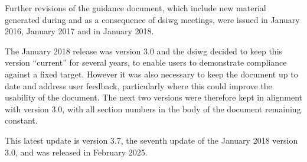 Further revisions of the guidance document, which include new material generated during and as a consequence of \gls{dsiwg} meetings, were issued in January 2016, January 2017 and in January 2018.

The January 2018 release was version 3.0 and the \gls{dsiwg} decided to keep this version ``current'' for several years, to enable users to demonstrate compliance against a fixed target. However it was also necessary to keep the document up to date and address user feedback, particularly where this could improve the usability of the document. The next two versions were therefore kept in alignment with version 3.0, with all section numbers in the body of the document remaining constant.

This latest update is version 3.7, the seventh update of the January 2018 version 3.0, and was released in February 2025.

